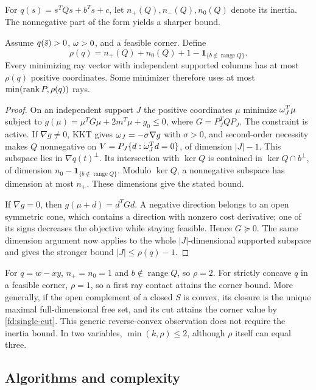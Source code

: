 For $q(s)=s^TQs+b^Ts+c$, let $n_+(Q),n_-(Q),n_0(Q)$ denote its inertia.
The nonnegative part of the form yields a sharper bound.
\begin{theorem}\label{fd:inertia}
Assume $q(\bar s)>0$, $\omega>0$, and a feasible corner. Define
\[
 \rho(q)=n_+(Q)+n_0(Q)+1-\mathbf1_{\{b\notin\operatorname{range}Q\}}.
\]
Every minimizing ray vector with independent supported columns has
at most $\rho(q)$ positive coordinates. Some minimizer therefore uses
at most $\min(\operatorname{rank} P,\rho(q))$ rays.
\end{theorem}
\begin{proof}
On an independent support $J$ the positive coordinates $\mu$ minimize
$\omega_J^T\mu$ subject to
$g(\mu)=\mu^TG\mu+2m^T\mu+g_0\le0$, where $G=P_J^TQP_J$.
The constraint is active. If $\nabla g\ne0$, KKT gives
$\omega_J=-\sigma\nabla g$ with $\sigma>0$, and second-order necessity
makes $Q$ nonnegative on
$V=P_J\{d:\omega_J^Td=0\}$, of dimension $|J|-1$.
This subspace lies in $\nabla q(t)^\perp$.
Its intersection with $\ker Q$ is contained in $\ker Q\cap b^\perp$,
of dimension $n_0-\mathbf1_{\{b\notin\operatorname{range}Q\}}$.
Modulo $\ker Q$, a nonnegative subspace has dimension at most $n_+$.
These dimensions give the stated bound.

If $\nabla g=0$, then $g(\mu+d)=d^TGd$. A negative direction belongs
to an open symmetric cone, which contains a direction with nonzero
cost derivative; one of its signs decreases the objective while staying
feasible. Hence $G\succeq0$. The same dimension argument now applies to
the whole $|J|$-dimensional supported subspace and gives the stronger
bound $|J|\le\rho(q)-1$.
\end{proof}

For $q=w-xy$, $n_+=n_0=1$ and $b\notin\operatorname{range}Q$, so
$\rho=2$. For strictly concave $q$ in a feasible corner, $\rho=1$, so
a first ray contact attains the corner bound. More generally, if the open complement of a
closed $S$ is convex, its closure is the unique maximal full-dimensional
free set, and its cut attains the corner value by \cref{fd:single-cut}.
This generic reverse-convex observation does not require the inertia
bound. In two variables, $\min(k,\rho)\le2$, although $\rho$ itself
can equal three.

\subsection{Algorithms and complexity}

